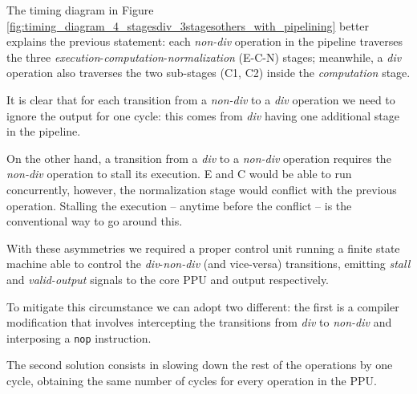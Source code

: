 The timing diagram in Figure \ref{fig:timing_diagram_4_stagesdiv_3stagesothers_with_pipelining}  better explains the previous statement: each \textit{non-div} operation in the pipeline traverses  the three \textit{execution}-\textit{computation}-\textit{normalization} (E-C-N) stages; meanwhile, a  \textit{div} operation also traverses the two sub-stages (C1, C2) inside the \textit{computation} stage.

It is clear that for each transition from a \textit{non-div} to a \textit{div} operation we need to ignore the output for one cycle: this comes from \textit{div} having one additional stage in the pipeline.

On the other hand, a transition from a \textit{div} to a  \textit{non-div} operation requires the \textit{non-div} operation to stall its execution. E and C would be able to run concurrently, however, the normalization stage would conflict with the previous operation. Stalling the execution -- anytime before the conflict -- is the conventional way to go around this.


With these asymmetries we required a proper control unit running a finite state machine able to control the \textit{div}-\textit{non-div} (and vice-versa) transitions, emitting \textit{stall} and \textit{valid-output} signals to the core PPU and output respectively.

To mitigate this circumstance we can adopt two different: the first is a compiler modification that involves intercepting the transitions from \textit{div} to \textit{non-div} and interposing a \texttt{nop} instruction.

The second solution consists in slowing down the rest of the operations by one cycle, obtaining the same number of cycles for every operation in the PPU.






